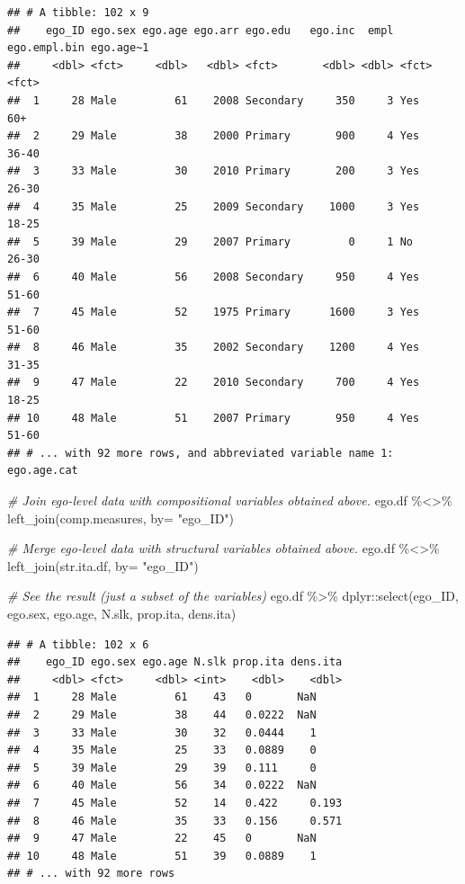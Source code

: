 \documentclass[
]{book}
\newenvironment{Shaded}{\begin{snugshade}}{\end{snugshade}}
\newcommand{\AttributeTok}[1]{\textcolor[rgb]{0.77,0.63,0.00}{#1}}
\newcommand{\CommentTok}[1]{\textcolor[rgb]{0.56,0.35,0.01}{\textit{#1}}}
\newcommand{\FunctionTok}[1]{\textcolor[rgb]{0.00,0.00,0.00}{#1}}
\newcommand{\NormalTok}[1]{#1}
\newcommand{\SpecialCharTok}[1]{\textcolor[rgb]{0.00,0.00,0.00}{#1}}
\newcommand{\StringTok}[1]{\textcolor[rgb]{0.31,0.60,0.02}{#1}}
\begin{document}
\begin{verbatim}
## # A tibble: 102 x 9
##    ego_ID ego.sex ego.age ego.arr ego.edu   ego.inc  empl ego.empl.bin ego.age~1
##     <dbl> <fct>     <dbl>   <dbl> <fct>       <dbl> <dbl> <fct>        <fct>    
##  1     28 Male         61    2008 Secondary     350     3 Yes          60+      
##  2     29 Male         38    2000 Primary       900     4 Yes          36-40    
##  3     33 Male         30    2010 Primary       200     3 Yes          26-30    
##  4     35 Male         25    2009 Secondary    1000     3 Yes          18-25    
##  5     39 Male         29    2007 Primary         0     1 No           26-30    
##  6     40 Male         56    2008 Secondary     950     4 Yes          51-60    
##  7     45 Male         52    1975 Primary      1600     3 Yes          51-60    
##  8     46 Male         35    2002 Secondary    1200     4 Yes          31-35    
##  9     47 Male         22    2010 Secondary     700     4 Yes          18-25    
## 10     48 Male         51    2007 Primary       950     4 Yes          51-60    
## # ... with 92 more rows, and abbreviated variable name 1: ego.age.cat
\end{verbatim}

\begin{Shaded}
\begin{Highlighting}[]
\CommentTok{\# Join ego{-}level data with compositional variables obtained above.}
\NormalTok{ego.df }\SpecialCharTok{\%\textless{}\textgreater{}\%} 
  \FunctionTok{left\_join}\NormalTok{(comp.measures, }\AttributeTok{by=} \StringTok{"ego\_ID"}\NormalTok{)}

\CommentTok{\# Merge ego{-}level data with structural variables obtained above.}
\NormalTok{ego.df }\SpecialCharTok{\%\textless{}\textgreater{}\%}
  \FunctionTok{left\_join}\NormalTok{(str.ita.df, }\AttributeTok{by=} \StringTok{"ego\_ID"}\NormalTok{)}

\CommentTok{\# See the result (just a subset of the variables)}
\NormalTok{ego.df }\SpecialCharTok{\%\textgreater{}\%}
\NormalTok{  dplyr}\SpecialCharTok{::}\FunctionTok{select}\NormalTok{(ego\_ID, ego.sex, ego.age, N.slk, prop.ita, dens.ita)}
\end{Highlighting}
\end{Shaded}

\begin{verbatim}
## # A tibble: 102 x 6
##    ego_ID ego.sex ego.age N.slk prop.ita dens.ita
##     <dbl> <fct>     <dbl> <int>    <dbl>    <dbl>
##  1     28 Male         61    43   0       NaN    
##  2     29 Male         38    44   0.0222  NaN    
##  3     33 Male         30    32   0.0444    1    
##  4     35 Male         25    33   0.0889    0    
##  5     39 Male         29    39   0.111     0    
##  6     40 Male         56    34   0.0222  NaN    
##  7     45 Male         52    14   0.422     0.193
##  8     46 Male         35    33   0.156     0.571
##  9     47 Male         22    45   0       NaN    
## 10     48 Male         51    39   0.0889    1    
## # ... with 92 more rows
\end{verbatim}
\end{document}
